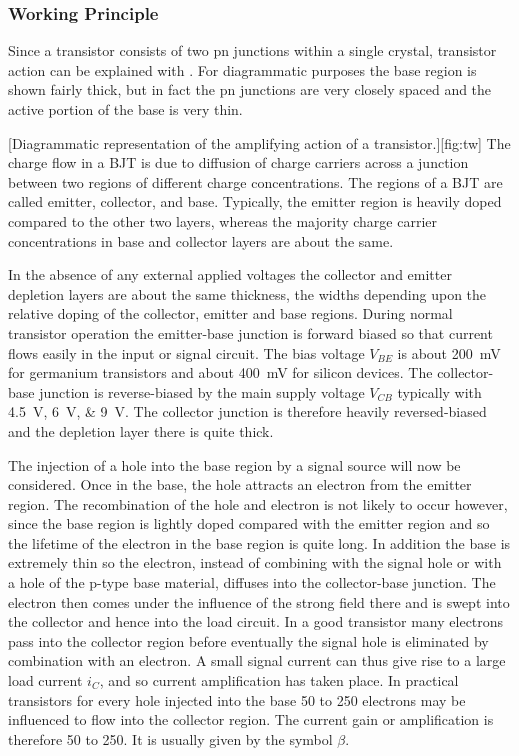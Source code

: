 \subsubsection{Working Principle}
Since a transistor consists of two pn junctions within a single crystal, transistor action can be explained with . For diagrammatic purposes the base region is shown fairly thick, but in fact the pn junctions are very closely spaced and the active portion of the base is very thin.\par
%
[Diagrammatic representation of the amplifying action of a transistor.][fig:tw]
%
The charge flow in a \ac{BJT} is due to diffusion of charge carriers across a junction between two regions of different charge concentrations. The regions of a BJT are called emitter, collector, and base. Typically, the emitter region is heavily doped compared to the other two layers, whereas the majority charge carrier concentrations in base and collector layers are about the same.\par
%
In the absence of any external applied voltages the collector and emitter depletion layers are about the same thickness, the widths depending upon the relative doping of the collector, emitter and base regions. During normal transistor operation the emitter-base junction is forward biased so that current flows easily in the input or signal circuit. The bias voltage $V_{BE}$ is about \SI{200}{\milli\volt} for germanium transistors and about \SI{400}{\milli\volt} for silicon devices. The collector-base junction is reverse-biased by the main supply voltage $V_{CB}$ typically with \SIlist{4.5;6;9}{\volt}. The collector junction is therefore heavily reversed-biased and the depletion layer there is quite thick.\par
%
The injection of a hole into the base region by a signal source will now be considered. Once in the base, the hole attracts an electron from the emitter region. The recombination of the hole and electron is not likely to occur however, since the base region is lightly doped compared with the emitter region and so the lifetime of the electron in the base region is quite long. In addition the base is extremely thin so the electron, instead of combining with the signal hole or with a hole of the p-type base material, diffuses into the collector-base junction. The electron then comes under the influence of the strong field there and is swept into the collector and hence into the load circuit. In a good transistor many electrons pass into the collector region before eventually the signal hole is eliminated by combination with an electron. A small signal current can thus give rise to a large load current $i_{C}$, and so current amplification has taken place. In practical transistors for every hole injected into the base 50 to 250 electrons may be influenced to flow into the collector region. The current gain or amplification is therefore 50 to 250. It is usually given by the symbol $\beta$.\par

